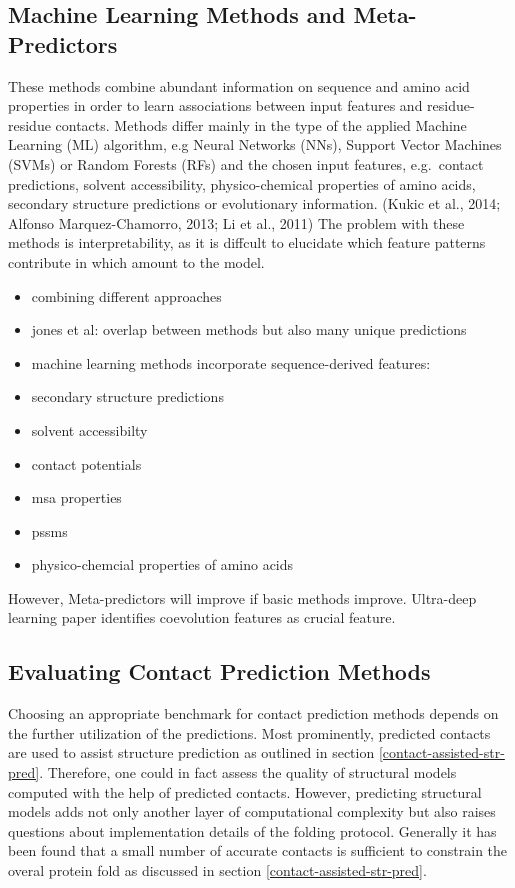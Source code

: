 \documentclass[12pt,a4paper,twoside]{book}
\providecommand{\tightlist}{%
  \setlength{\itemsep}{0pt}\setlength{\parskip}{0pt}}
\theoremstyle{definition}
\theoremstyle{definition}
\theoremstyle{remark}
\begin{document}
\subsection{Machine Learning Methods and
Meta-Predictors}\label{meta-predictors}

These methods combine abundant information on sequence and amino acid
properties in order to learn associations between input features and
residue-residue contacts. Methods differ mainly in the type of the
applied Machine Learning (ML) algorithm, e.g Neural Networks (NNs),
Support Vector Machines (SVMs) or Random Forests (RFs) and the chosen
input features, e.g.~contact predictions, solvent accessibility,
physico-chemical properties of amino acids, secondary structure
predictions or evolutionary information. (Kukic et al., 2014; Alfonso
Marquez-Chamorro, 2013; Li et al., 2011) The problem with these methods
is interpretability, as it is diffcult to elucidate which feature
patterns contribute in which amount to the model.

\begin{itemize}
\tightlist
\item
  combining different approaches
\item
  jones et al: overlap between methods but also many unique predictions
\item
  machine learning methods incorporate sequence-derived features:
\item
  secondary structure predictions
\item
  solvent accessibilty
\item
  contact potentials
\item
  msa properties
\item
  pssms
\item
  physico-chemcial properties of amino acids
\end{itemize}

However, Meta-predictors will improve if basic methods improve.
Ultra-deep learning paper identifies coevolution features as crucial
feature.

\subsection{Evaluating Contact Prediction
Methods}\label{intro-cp-evaluation}

Choosing an appropriate benchmark for contact prediction methods depends
on the further utilization of the predictions. Most prominently,
predicted contacts are used to assist structure prediction as outlined
in section \ref{contact-assisted-str-pred}. Therefore, one could in fact
assess the quality of structural models computed with the help of
predicted contacts. However, predicting structural models adds not only
another layer of computational complexity but also raises questions
about implementation details of the folding protocol. Generally it has
been found that a small number of accurate contacts is sufficient to
constrain the overal protein fold as discussed in section
\ref{contact-assisted-str-pred}.
\end{document}
